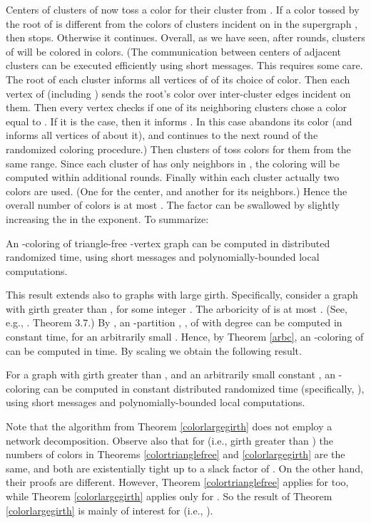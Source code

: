 \documentclass[11pt]{article}
\begin{document}
Centers of clusters of  now toss a color for their cluster from . If a color tossed by the root  of  is different from the colors of clusters incident on  in the supergraph , then  stops. Otherwise it continues. Overall, as we have seen, after  rounds, clusters of  will be colored in  colors. (The communication between centers of adjacent clusters can be executed efficiently using short messages.
This requires some care. The root  of each cluster informs all vertices of  of its choice of color. Then each vertex of  (including ) sends the root's color  over inter-cluster edges incident on them. Then every vertex  checks if one of its neighboring clusters chose a color  equal to . If it is the case, then it informs . In this case  abandons its color (and informs all vertices of  about it), and continues to the next round of the randomized coloring procedure.) Then clusters of  toss colors for them from the same range. Since each cluster of  has only  neighbors in , the coloring will be computed within additional  rounds.
Finally within each cluster  actually two colors are used. (One for the center, and another for its neighbors.) Hence the overall number of colors is at most . The factor  can be swallowed by slightly increasing the  in the exponent. To summarize:
\begin{thm} \label{colortrianglefree}
An -coloring of triangle-free -vertex graph can be computed in  distributed randomized time, using short messages and polynomially-bounded local computations.
\end{thm}
This result extends also to graphs with large girth. Specifically, consider a graph  with girth greater than , for some integer . The arboricity of  is at most . (See, e.g., \cite{B04}. Theorem 3.7.) By \cite{BE08}, an -partition , , of  with degree  can be computed in constant time, for an arbitrarily small . Hence, by Theorem \ref{arbc}, an -coloring of  can be computed in  time. By scaling  we obtain the following result.
\begin{thm} \label{colorlargegirth}
For a graph  with girth greater than , and an arbitrarily small constant , an -coloring can be computed in constant distributed randomized time (specifically, ),  using short messages and polynomially-bounded local computations.
\end{thm}


Note that the algorithm from Theorem \ref{colorlargegirth} does not employ a network decomposition. Observe also that for  (i.e., girth greater than ) the numbers of colors in Theorems \ref{colortrianglefree} and \ref{colorlargegirth} are the same, and both are existentially tight up to a slack factor of . On the other hand, their proofs are different. However, Theorem \ref{colortrianglefree} applies for  too, while Theorem \ref{colorlargegirth} applies only for . So the result of Theorem \ref{colorlargegirth} is mainly of interest for  (i.e., ).
\end{document}
